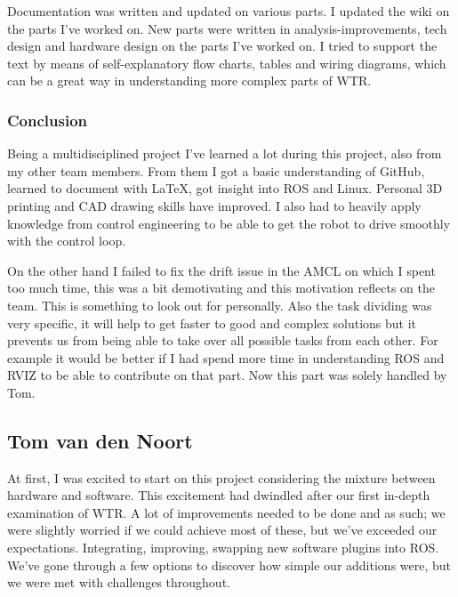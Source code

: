 Documentation was written and updated on various parts. 
I updated the wiki on the parts I've worked on. 
New parts were written in analysis-improvements, tech design and hardware design on the parts I've worked on. 
I tried to support the text by means of self-explanatory flow charts, tables and wiring diagrams, which can be a great way in understanding more complex parts of WTR. 

\subsubsection{Conclusion}
Being a multidisciplined project I've learned a lot during this project, also from my other team members.
From them I got a basic understanding of GitHub, learned to document with \LaTeX, got insight into ROS and Linux. 
Personal 3D printing and CAD drawing skills have improved. 
I also had to heavily apply knowledge from control engineering to be able to get the robot to drive smoothly with the control loop.

On the other hand I failed to fix the drift issue in the AMCL on which I spent too much time, this was a bit demotivating and this motivation reflects on the team. This is something to look out for personally. 
Also the task dividing was very specific, it will help to get faster to good and complex solutions but it prevents us from being able to take over all possible tasks from each other. 
For example it would be better if I had spend more time in understanding ROS and RVIZ to be able to contribute on that part. 
Now this part was solely handled by Tom.

\newpage

\subsection{Tom van den Noort}
At first, I was excited to start on this project considering the mixture between hardware and software. 
This excitement had dwindled after our first in-depth examination of WTR. 
A lot of improvements needed to be done and as such; we were slightly worried if we could achieve most of these, but we've exceeded our expectations.
Integrating, improving, swapping new software plugins into ROS. We've gone through a few options to discover how simple our additions were, but we were met with challenges throughout.

